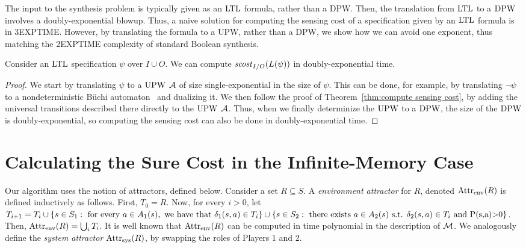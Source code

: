 \documentclass[runningheads,a4paper]{llncs}
\newcommand{\LTL}{{\ensuremath{\rm LTL}}\xspace}
\newcommand{\DPW}{\mbox{\rm DPW}\xspace}
\newcommand{\UPW}{\mbox{\rm UPW}\xspace}
\newcommand{\A}{{\cal A}}
\newcommand{\M}{{\cal M}}
\newcommand{\scost}{{\it scost}}
\newcommand{\MDPProb}{{\rm P}}
\newcommand{\buchi}{B\"uchi\xspace}
\newcommand{\attr}{{\rm Attr}}
\newcommand{\env}{{\rm env}}
\newcommand{\sys}{{\rm sys}}
\begin{document}
The input to the synthesis problem is typically given as an \LTL formula, rather than a \DPW. Then, the translation from $\LTL$ to a $\DPW$ involves a doubly-exponential blowup. Thus, a naive solution for computing the sensing cost of a specification given by an $\LTL$ formula is in 3EXPTIME. However, by translating the formula to a \UPW, rather than a \DPW, we show how we can avoid one exponent, thus matching the 2EXPTIME complexity of standard Boolean synthesis.
\vspace*{-5pt}
\begin{theorem}
\label{thm:LTL sensing cost}
Consider an \LTL specification $\psi$ over $I\cup O$. We can compute $\scost_{I/O}(L(\psi))$ in doubly-exponential time.
\end{theorem}
\vspace*{-12pt}
\begin{proof}
We start by translating $\psi$ to a $\UPW$ $\A$ of size single-exponential in the size of $\psi$. This can be done, for example, by translating $\neg \psi$ to a nondeterministic \buchi automaton~\cite{VW94} and dualizing it. We then follow the proof of Theorem~\ref{thm:compute sensing cost}, by adding the universal transitions described there directly to the $\UPW$ $\A$. Thus, when we finally determinize the $\UPW$ to a $\DPW$, the size of the $\DPW$ is doubly-exponential, 
so 
computing the sensing cost can also be done in doubly-exponential time.
\end{proof}

\small



\normalsize

\appendix

\section{Calculating the Sure Cost in the Infinite-Memory Case}
\label{app inf memory}

Our algorithm uses the notion of attractors, defined below.
Consider a set $R\subseteq S$. A {\em environment attractor} for $R$, denoted $\attr_{\env}(R)$ is defined inductively as follows. First, $T_0=R$. Now, for every $i>0$, let $T_{i+1}=T_i\cup \{s\in S_1: \text{ for every } a\in A_1(s),\text{ we have that }\delta_1(s,a)\in T_i\} \cup \{s\in S_2: \text{ there exists }a\in A_2(s)\text{ s.t. }\delta_2(s,a)\in T_i \text{ and \MDPProb(s,a)>0}\}$. Then, $\attr_{\env}(R)=\bigcup_{i}T_i$. It is well known that $\attr_{\env}(R)$ can be computed in time polynomial in the description of $\M$. We analogously define the {\em system attractor} $\attr_{\sys}(R)$, by swapping the roles of Players $1$ and $2$.
\end{document}
